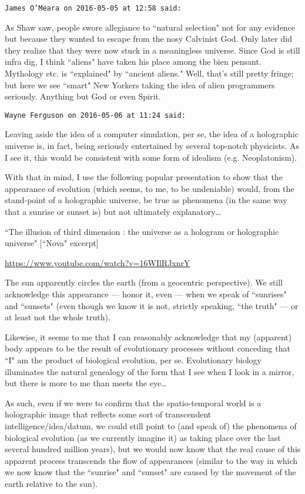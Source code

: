 \begin{footnotesize}\begin{sffamily}



\texttt{James O'Meara on 2016-05-05 at 12:58 said: }

As Shaw saw, people swore allegiance to ``natural selection" not for any evidence but because they wanted to escape from the nosy Calvinist God. Only later did they realize that they were now stuck in a meaningless universe. Since God is still infra dig, I think ``aliens" have taken his place among the bien pensant. Mythology etc. is ``explained" by ``ancient aliens." Well, that's still pretty fringe; but here we see ``smart" New Yorkers taking the idea of alien programmers seriously. Anything but God or even Spirit.


\hfill

\texttt{Wayne Ferguson on 2016-05-06 at 11:24 said: }

Leaving aside the idea of a computer simulation, per se, the idea of a holographic universe is, in fact, being seriously entertained by several top-notch physicists. As I see it, this would be consistent with some form of idealism (e.g. Neoplatonism).

With that in mind, I use the following popular presentation to show that the appearance of evolution (which seems, to me, to be undeniable) would, from the stand-point of a holographic universe, be true as phenomena (in the same way that a sunrise or sunset is) but not ultimately explanatory…

``The illusion of third dimension : the universe as a hologram or holographic universe" [``Nova" excerpt]

\url{https://www.youtube.com/watch?v=16WIlRJxnrY}

The sun apparently circles the earth (from a geocentric perspective). We still acknowledge this appearance — honor it, even — when we speak of ``sunrises" and ``sunsets" (even though we know it is not, strictly speaking, ``the truth" — or at least not the whole truth).

Likewise, it seems to me that I can reasonably acknowledge that my (apparent) body appears to be the result of evolutionary processes without conceding that ``I" am the product of biological evolution, per se. Evolutionary biology illuminates the natural genealogy of the form that I see when I look in a mirror, but there is more to me than meets the eye…

As such, even if we were to confirm that the spatio-temporal world is a holographic image that reflects some sort of transcendent intelligence/idea/datum, we could still point to (and speak of) the phenomena of biological evolution (as we currently imagine it) as taking place over the last several hundred million years), but we would now know that the real cause of this apparent process transcends the flow of appearances (similar to the way in which we now know that the ``sunrise" and ``sunset" are caused by the movement of the earth relative to the sun).


\end{sffamily}
\end{footnotesize}
